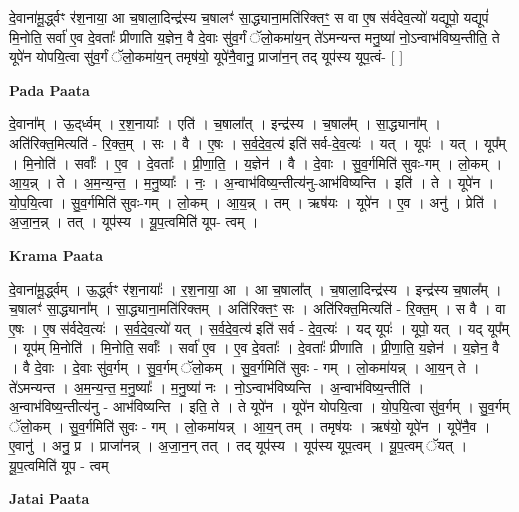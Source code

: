 \documentclass[17pt]{extarticle}
\begin{document}
दे॒वाना॑मू॒र्द्ध्वꣳ र॑श॒नाया॒ आ च॒षाला॒दिन्द्र॑स्य च॒षालꣳ॑ सा॒द्ध्याना॒मति॑रिक्तꣳ॒॒ स वा ए॒ष स॑र्वदेव॒त्यो॑ यद्यूपो॒ यद्यूपं॑ मि॒नोति॒ सर्वा॑ ए॒व दे॒वताः᳚ प्रीणाति य॒ज्ञेन॒ वै दे॒वाः सु॑व॒र्गं ॅलो॒कमा॑य॒न् ते॑ऽमन्यन्त मनु॒ष्या॑ नो॒ऽन्वाभ॑विष्य॒न्तीति॒ ते यूपे॑न योपयि॒त्वा सु॑व॒र्गं ॅलो॒कमा॑य॒न् तमृष॑यो॒ यूपे॑नै॒वानु॒ प्राजा॑न॒न् तद् यूप॑स्य यूप॒त्वं- [  ] \newline

\textbf{Pada Paata} \newline

दे॒वाना᳚म् । ऊ॒द्‌र्ध्वम् । र॒श॒नायाः᳚ । एति॑ । च॒षाला᳚त् । इन्द्र॑स्य । च॒षाल᳚म् । सा॒द्ध्याना᳚म् । अति॑रिक्त॒मित्यति॑ - रि॒क्त॒म् । सः । वै । ए॒षः । स॒र्व॒दे॒व॒त्य॑ इति॑ सर्व-दे॒व॒त्यः॑ । यत् । यूपः॑ । यत् । यूप᳚म् । मि॒नोति॑ । सर्वाः᳚ । ए॒व । दे॒वताः᳚ । प्री॒णा॒ति॒ । य॒ज्ञेन॑ । वै । दे॒वाः । सु॒व॒र्गमिति॑ सुवः-गम् । लो॒कम् । आ॒य॒न्न् । ते । अ॒म॒न्य॒न्त॒ । म॒नु॒ष्याः᳚ । नः॒ । अ॒न्वाभ॑विष्य॒न्तीत्य॑नु-आभ॑विष्यन्ति । इति॑ । ते । यूपे॑न । यो॒प॒यि॒त्वा । सु॒व॒र्गमिति॑ सुवः-गम् । लो॒कम् । आ॒य॒न्न् । तम् । ऋष॑यः । यूपे॑न । ए॒व । अनु॑ । प्रेति॑ । अ॒जा॒न॒न्न् । तत् । यूप॑स्य । यू॒प॒त्वमिति॑ यूप- त्वम् ।  \newline


\textbf{Krama Paata} \newline

दे॒वाना॑मू॒र्द्ध्वम् । ऊ॒र्द्ध्वꣳ र॑श॒नायाः᳚ । र॒श॒नाया॒ आ । आ च॒षाला᳚त् । च॒षाला॒दिन्द्र॑स्य । इन्द्र॑स्य च॒षाल᳚म् । च॒षालꣳ॑ सा॒द्ध्याना᳚म् । सा॒द्ध्याना॒मति॑रिक्तम् । अति॑रिक्तꣳ॒॒ सः । अति॑रिक्त॒मित्यति॑ - रि॒क्त॒म् । स वै । वा ए॒षः । ए॒ष स॑र्वदेव॒त्यः॑ । स॒र्व॒दे॒व॒त्यो॑ यत् । स॒र्व॒दे॒व॒त्य॑ इति॑ सर्व - दे॒व॒त्यः॑ । यद् यूपः॑ । यूपो॒ यत् । यद् यूप᳚म् । यूप॑म् मि॒नोति॑ । मि॒नोति॒ सर्वाः᳚ । सर्वा॑ ए॒व । ए॒व दे॒वताः᳚ । दे॒वताः᳚ प्रीणाति । प्री॒णा॒ति॒ य॒ज्ञेन॑ । य॒ज्ञेन॒ वै । वै दे॒वाः । दे॒वाः सु॑व॒र्गम् । सु॒व॒र्गम् ॅलो॒कम् । सु॒व॒र्गमिति॑ सुवः - गम् । लो॒कमा॑यन्न् । आ॒य॒न् ते । ते॑ऽमन्यन्त । अ॒म॒न्य॒न्त॒ म॒नु॒ष्याः᳚ । म॒नु॒ष्या॑ नः । नो॒ऽन्वाभ॑विष्यन्ति । अ॒न्वाभ॑विष्य॒न्तीति॑ । अ॒न्वाभ॑विष्य॒न्तीत्य॑नु - आभ॑विष्यन्ति । इति॒ ते । ते यूपे॑न । यूपे॑न योपयि॒त्वा । यो॒प॒यि॒त्वा सु॑व॒र्गम् । सु॒व॒र्गम् ॅलो॒कम् । सु॒व॒र्गमिति॑ सुवः - गम् । लो॒कमा॑यन्न् । आ॒य॒न् तम् । तमृष॑यः । ऋष॑यो॒ यूपे॑न । यूपे॑नै॒व । ए॒वानु॑ । अनु॒ प्र । प्राजा॑नन्न् । अ॒जा॒न॒न् तत् । तद् यूप॑स्य । यूप॑स्य यूप॒त्वम् । यू॒प॒त्वम् ॅयत् । यू॒प॒त्वमिति॑ यूप - त्वम् \newline

\textbf{Jatai Paata} \newline
\end{document}
